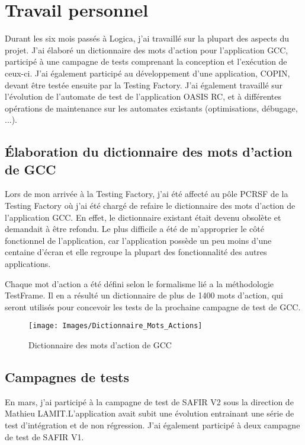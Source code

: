\chapter{Travail personnel}

Durant les six mois passés à Logica, j'ai travaillé sur la plupart des aspects du projet. J'ai élaboré un dictionnaire des mots d'action pour l'application GCC, participé à une campagne de tests comprenant la conception et l'exécution de ceux-ci. J'ai également participé au développement d'une application, COPIN, devant être testée ensuite par la Testing Factory. J'ai également travaillé sur l'évolution de l'automate de test de l'application OASIS RC, et à différentes opérations de maintenance sur les automates existants (optimisations, débugage, ...).

\section{Élaboration du dictionnaire des mots d'action de GCC}

Lors de mon arrivée à la Testing Factory, j'ai été affecté au pôle PCRSF de la Testing Factory où j'ai été chargé de refaire le dictionnaire des mots d'action de l'application GCC. En effet, le dictionnaire existant était devenu obsolète et demandait à être refondu. Le plus difficile a été de m'approprier le côté fonctionnel de l'application, car l'application possède un peu moins d'une centaine d'écran et elle regroupe la plupart des fonctionnalité des autres applications.

Chaque mot d'action a été défini selon le formalisme lié a la méthodologie TestFrame.
Il en a résulté un dictionnaire de plus de 1400 mots d'action, qui seront utilisés pour concevoir les tests de la prochaine campagne de test de GCC.
\begin{figure}
  \begin{center}
    \texttt{[image: Images/Dictionnaire\_Mots\_Actions]}
   \end{center}
  \caption{Dictionnaire des mots d'action de GCC}
  \label{Dictionnaire des mots d'action de GCC}
\end{figure}

\section{Campagnes de tests} 

En mars, j'ai participé à la campagne de test de SAFIR V2 sous la direction de Mathieu LAMIT.L'application avait subit une évolution entrainant une série de test d'intégration et de non régression. 
J'ai également participé à deux campagne de test de SAFIR V1.

